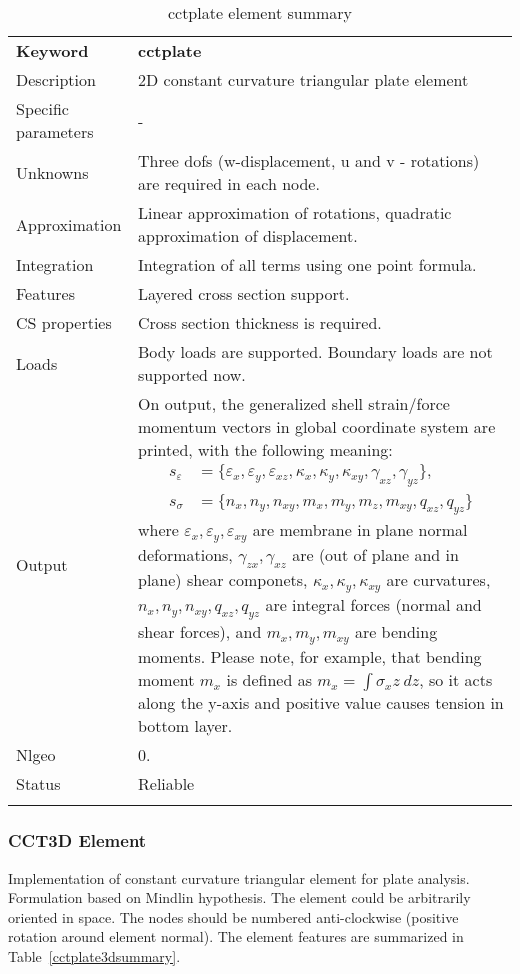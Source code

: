 \documentclass[a4paper]{article}
\newcommand{\param}[1]{\texttt{#1}} %
\newcommand{\templabel}{}%
\newcommand{\tempcaption}{}%
\newcounter{nelpar}
\newenvironment{elementsummary}[5]{%
  \gdef\tempcaption{#4}%
  \gdef\templabel{#5}%
  \setcounter{nelpar}{0}%
  \begin{center} %
    \begin{table}[!htb] %
      \begin{tabular}{|l|p{9cm}|}\hline %
        {\bf Keyword} & \bf{#1}\\ %
        {Description} & {#2}\\ %
        {Specific parameters} & {#3}\\ \hline %
}{
  \\ \hline %
      \end{tabular}%
      \caption{\tempcaption}%
      \label{\templabel}%
    \end{table}%
  \end{center}%
}
\newcommand{\elementParam}[1]{%
  \ifthenelse{\value{nelpar}>0} %
             {&{#1}}%
             {\setcounter{nelpar}{1}Parameters&{#1}}%
             \\%
}
\newcommand{\elementDescription}[2]{{#1} & {#2}\\ }
\begin{document}
\begin{elementsummary}{cctplate}{2D constant curvature triangular plate element}{-}{cctplate element summary}{cctplatesummary}
\elementDescription{Unknowns}{Three dofs (w-displacement, u and v - rotations) are required in each node.}
\elementDescription{Approximation}{Linear approximation of rotations, quadratic approximation of displacement.}
\elementDescription{Integration}{Integration of all terms using one point formula.}
\elementDescription{Features}{Layered cross section support.}
\elementDescription{CS properties}{Cross section thickness is required.}
\elementDescription{Loads}{Body loads are supported. Boundary loads are not supported now.}
\elementDescription{Output}{On output, the generalized shell strain/force momentum vectors in global coordinate system are printed, with the following meaning:
\begin{align*}
s_{\varepsilon} &=\{\varepsilon_x, \varepsilon_y, \varepsilon_{xz}, \kappa_x, \kappa_y, \kappa_{xy}, \gamma_{xz}, \gamma_{yz}\},\\
s_{\sigma} &=\{n_x, n_y, n_{xy}, m_x, m_y, m_z, m_{xy}, q_{xz}, q_{yz}\}
\end{align*}
where $\varepsilon_x, \varepsilon_y, \varepsilon_{xy}$ are membrane in plane normal deformations, $\gamma_{zx}, \gamma_{xz}$ are (out of plane and in plane) shear componets, $\kappa_x, \kappa_y, \kappa_{xy}$ are curvatures, $n_x, n_y, n_{xy}, q_{xz}, q_{yz}$ are integral forces (normal and shear forces), and $m_x, m_y, m_{xy}$ are bending moments. 
Please note, for example, that bending moment $m_x$ is defined as $m_x=\int \sigma_x z\ dz$, so it acts along the y-axis and positive value causes tension in bottom layer.}
\elementDescription{Nlgeo}{0.}
\elementDescription{Status}{Reliable}
\end{elementsummary}


\subsubsection {CCT3D Element}
Implementation of constant curvature triangular element for plate
analysis. Formulation based on Mindlin hypothesis. The element could be arbitrarily oriented in space. 
The nodes should be numbered anti-clockwise (positive rotation around element normal). 
The element features are summarized in Table~\ref{cctplate3dsummary}.
\end{document}

